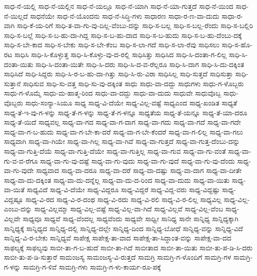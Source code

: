 {ಸಾಧ-ನೆ-ಯಲ್ಲಿ
ಸಾಧ-ನೆ-ಯಲ್ಲಿನ
ಸಾಧ-ನೆ-ಯಲ್ಲೂ
ಸಾಧ-ನೆ-ಯಾಗಿ
ಸಾಧ-ನೆ-ಯಾ-ಗುತ್ತದೆ
ಸಾಧ-ನೆ-ಯಿಂದ
ಸಾಧ-ನೆ-ಯಿಲ್ಲದೆ
ಸಾಧನೆಯೇ
ಸಾಧ-ನೆ-ಯೊಂದನು
ಸಾಧ-ನೆ-ಸಿದ್ಧಿ-ಗಳು
ಸಾಧಾರಣ
ಸಾಧಾ-ರ-ಣ-ವಾ-ದುದು
ಸಾಧಾ-ರ-ವಾಗಿ
ಸಾಧಿ-ಕೆ-ಯ-ರಿಗೆ
ಸಾಧಿ-ತ-ವಾ-ಗು-ವು-ದಿಲ್ಲ-ವೆಂಬು-ದನ್ನು
ಸಾಧಿ-ಸ-ಬಲ್ಲ
ಸಾಧಿ-ಸ-ಬಲ್ಲ-ರೆಂದು
ಸಾಧಿ-ಸ-ಬಲ್ಲಿರಿ
ಸಾಧಿ-ಸ-ಬಲ್ಲೆ
ಸಾಧಿ-ಸ-ಬ-ಹು-ದಾ-ಗಿದ್ದ
ಸಾಧಿ-ಸ-ಬ-ಹು-ದಾದ
ಸಾಧಿ-ಸ-ಬ-ಹುದು
ಸಾಧಿ-ಸ-ಬ-ಹು-ದೆಂಬು-ದಕ್ಕೆ
ಸಾಧಿ-ಸ-ಬೇ-ಕಾದ
ಸಾಧಿ-ಸ-ಬೇಕು
ಸಾಧಿ-ಸ-ಬೇ-ಕೆಂಬ
ಸಾಧಿ-ಸ-ಲಾ-ಗದೆ
ಸಾಧಿ-ಸ-ಲಾ-ರೆವು
ಸಾಧಿಸಲು
ಸಾಧಿ-ಸ-ಹೊ-ರಟ
ಸಾಧಿಸಿ
ಸಾಧಿ-ಸಿ-ಕೊಳ್ಳುತ್ತ
ಸಾಧಿ-ಸಿ-ಕೊಳ್ಳು-ವು-ದ-ರಲ್ಲಿ
ಸಾಧಿಸಿತ್ತು
ಸಾಧಿಸಿದ
ಸಾಧಿ-ಸಿ-ದಂತಾ-ಗ-ಲಿಲ್ಲ
ಸಾಧಿ-ಸಿ-ದಂತಾ-ಯಿತು
ಸಾಧಿ-ಸಿ-ದಂತಾ-ಯಿತೇ
ಸಾಧಿ-ಸಿ-ದರು
ಸಾಧಿ-ಸಿ-ದ-ವ-ರೆಲ್ಲರೂ
ಸಾಧಿ-ಸಿ-ದಾಗ
ಸಾಧಿ-ಸಿ-ದು-ದಕ್ಕಿಂತ
ಸಾಧಿಸಿದೆ
ಸಾಧಿ-ಸಿದ್ದರು
ಸಾಧಿ-ಸಿ-ರ-ಬ-ಹು-ದಾ-ಗಿತ್ತು
ಸಾಧಿ-ಸಿ-ರು-ವಿರಾ
ಸಾಧಿಸಿಲ್ಲ
ಸಾಧಿ-ಸುತ್ತದೆ
ಸಾಧಿಸುತ್ತಾ
ಸಾಧಿ-ಸುತ್ತಾನೆ
ಸಾಧಿಸುವ
ಸಾಧಿ-ಸು-ವತ್ತ
ಸಾಧಿ-ಸು-ವು-ದಕ್ಕಿಂತ
ಸಾಧು
ಸಾಧು-ವಾ-ದದ್ದು
ಸಾಧುಗಳು
ಸಾಧು-ಗ-ಳೊಬ್ಬರು
ಸಾಧು-ಗ-ಳೊಮ್ಮೆ
ಸಾಧು-ಮ-ಹಾತ್ಮ-ರಿಂದ
ಸಾಧು-ವಾ-ದದ್ದು
ಸಾಧು-ವಾ-ದುದು
ಸಾಧುವೇ
ಸಾಧುವೊಬ್ಬ
ಸಾಧು-ವೊಬ್ಬರು
ಸಾಧು-ಸಂನ್ಯಾ-ಸಿಯೂ
ಸಾಧ್ಯ
ಸಾಧ್ಯ-ವಿ-ದೆಯೇ
ಸಾಧ್ಯ-ವಿಲ್ಲ-ವಷ್ಟೆ
ಸಾಧ್ಯಎಂದ
ಸಾಧ್ಯ-ಖಂಡಿತ
ಸಾಧ್ಯತೆ
ಸಾಧ್ಯ-ತೆ-ಇ-ವು-ಗ-ಳನ್ನು
ಸಾಧ್ಯ-ತೆ-ಗ-ಳನ್ನು
ಸಾಧ್ಯ-ತೆ-ಗ-ಳನ್ನೂ
ಸಾಧ್ಯತೆಯ
ಸಾಧ್ಯ-ತೆ-ಯನ್ನೂ
ಸಾಧ್ಯ-ತೆ-ಯಾ-ದರೂ
ಸಾಧ್ಯ-ತೆ-ಯಿದೆ
ಸಾಧ್ಯವಲ್ಲ
ಸಾಧ್ಯ-ವಾ-ಗದ
ಸಾಧ್ಯ-ವಾ-ಗ-ದಾಗ
ಸಾಧ್ಯ-ವಾ-ಗದು
ಸಾಧ್ಯ-ವಾ-ಗದೆ
ಸಾಧ್ಯ-ವಾ-ಗದೇ
ಸಾಧ್ಯ-ವಾ-ಗ-ಬ-ಹುದು
ಸಾಧ್ಯ-ವಾ-ಗ-ಬೇ-ಕಾ-ದರೆ
ಸಾಧ್ಯ-ವಾ-ಗ-ಬೇ-ಕೆಂದರೆ
ಸಾಧ್ಯ-ವಾ-ಗ-ಲಿಲ್ಲ
ಸಾಧ್ಯ-ವಾ-ಗಲು
ಸಾಧ್ಯವಾಗಿ
ಸಾಧ್ಯ-ವಾ-ಗಿಯೇ
ಸಾಧ್ಯ-ವಾ-ಗಿಲ್ಲ
ಸಾಧ್ಯ-ವಾ-ಗಿವೆ
ಸಾಧ್ಯ-ವಾ-ಗುತ್ತದೆ
ಸಾಧ್ಯ-ವಾ-ಗುತ್ತ-ದೆಂಬು-ದನ್ನು
ಸಾಧ್ಯ-ವಾ-ಗುತ್ತಿ-ದೆಯೆ
ಸಾಧ್ಯ-ವಾ-ಗುತ್ತಿ-ದೆಯೇ
ಸಾಧ್ಯ-ವಾ-ಗುತ್ತಿಲ್ಲ
ಸಾಧ್ಯ-ವಾ-ಗುವ
ಸಾಧ್ಯ-ವಾ-ಗು-ವಂತೆ
ಸಾಧ್ಯ-ವಾ-ಗು-ವ-ವ-ರೆಗೂ
ಸಾಧ್ಯ-ವಾ-ಗು-ವು-ದಷ್ಟೆ
ಸಾಧ್ಯ-ವಾ-ಗು-ವುದು
ಸಾಧ್ಯ-ವಾ-ಗು-ವುದೆ
ಸಾಧ್ಯ-ವಾ-ಗು-ವು-ದೆಂದು
ಸಾಧ್ಯ-ವಾ-ಗು-ವುದೇ
ಸಾಧ್ಯವಾದ
ಸಾಧ್ಯ-ವಾ-ದರೂ
ಸಾಧ್ಯ-ವಾ-ದರೆ
ಸಾಧ್ಯ-ವಾ-ದಷ್ಟು
ಸಾಧ್ಯ-ವಾ-ದಾಗ
ಸಾಧ್ಯ-ವಾ-ದೀತೇ
ಸಾಧ್ಯ-ವಾ-ದು-ದಕ್ಕಿಂತ
ಸಾಧ್ಯ-ವಾ-ದು-ದನ್ನೆಲ್ಲ
ಸಾಧ್ಯ-ವಾ-ದು-ದ-ರಿಂದ
ಸಾಧ್ಯ-ವಾ-ದುದು
ಸಾಧ್ಯ-ವಾ-ಯಿತು
ಸಾಧ್ಯ-ವಾ-ಯಿತೆ
ಸಾಧ್ಯವಿದೆ
ಸಾಧ್ಯ-ವಿ-ದೆಯೇ
ಸಾಧ್ಯ-ವಿದ್ದರೂ
ಸಾಧ್ಯ-ವಿದ್ದರೆ
ಸಾಧ್ಯ-ವಿದ್ದ-ವರು
ಸಾಧ್ಯ-ವಿದ್ದಷ್ಟು
ಸಾಧ್ಯ-ವಿದ್ದಷ್ಟೂ
ಸಾಧ್ಯ-ವಿ-ರದ
ಸಾಧ್ಯ-ವಿ-ರ-ದಂಥ
ಸಾಧ್ಯ-ವಿ-ರದು
ಸಾಧ್ಯ-ವಿ-ರಲಿ
ಸಾಧ್ಯ-ವಿ-ರ-ಲಿಲ್ಲ
ಸಾಧ್ಯವಿಲ್ಲ
ಸಾಧ್ಯ-ವಿಲ್ಲ-ಎಂಬು-ದನ್ನು
ಸಾಧ್ಯ-ವಿಲ್ಲಮ್ಮಾ
ಸಾಧ್ಯ-ವಿಲ್ಲ-ವಷ್ಟೆ
ಸಾಧ್ಯ-ವಿಲ್ಲ-ವಾ-ಗಿದೆ
ಸಾಧ್ಯ-ವಿಲ್ಲವೆ
ಸಾಧ್ಯ-ವಿಲ್ಲ-ವೆಂಬ
ಸಾಧ್ಯ-ವಿಲ್ಲವೇ
ಸಾಧ್ಯವೂ
ಸಾಧ್ಯವೆ
ಸಾಧ್ಯ-ವೆಂದಲ್ಲ
ಸಾಧ್ಯವೆಂದು
ಸಾಧ್ಯವೇ
ಸಾಧ್ವೀ
ಸಾನಿಧ್ಯ
ಸಾನೇ
ಸಾನ್ನಿಧ್ಯ
ಸಾನ್ನಿಧ್ಯಕ್ಕಾಗಿ
ಸಾನ್ನಿಧ್ಯಕ್ಕೆ
ಸಾನ್ನಿಧ್ಯದ
ಸಾನ್ನಿಧ್ಯ-ದಲ್ಲಿ
ಸಾನ್ನಿಧ್ಯ-ದಲ್ಲೇ
ಸಾನ್ನಿಧ್ಯ-ದಿಂದ
ಸಾನ್ನಿಧ್ಯ-ಬೋಧೆ
ಸಾನ್ನಿಧ್ಯ-ವನ್ನು
ಸಾನ್ನಿಧ್ಯ-ವಿದೆ
ಸಾನ್ನಿಧ್ಯ-ವಿ-ರ-ಬೇಕು
ಸಾನ್ನಿಧ್ಯವೆ
ಸಾಪೇಕ್ಷ
ಸಾಪೇಕ್ಷ-ತಾ-ವಾದ
ಸಾಪೇಕ್ಷ-ತಾ-ಸಿದ್ಧಾಂತ-ವನ್ನು
ಸಾಪೇಕ್ಷ-ವಾ-ದದ
ಸಾಫಲ್ಯಕ್ಕೆ
ಸಾಫಲ್ಯವು
ಸಾಬೀ-ತಾ-ಗ-ಬ-ಹುದೆ
ಸಾಬೀ-ತಾ-ಗಿದೆ
ಸಾಬೀತಾದ
ಸಾಬೀ-ತಾ-ಯಿತು
ಸಾಬೀ-ತು-ಪ-ಡಿ-ಸಿ-ದರು
ಸಾಬೀ-ತು-ಪ-ಡಿ-ಸುತ್ತಾರೆ
ಸಾಮಂಜಸ್ಯ
ಸಾಮಂಜಸ್ಯ-ವಿ-ರುತ್ತದೆ
ಸಾಮಗ್ರಿ
ಸಾಮಗ್ರಿ-ಗ-ಳೊಂದಿಗೆ
ಸಾಮಗ್ರಿ-ಗಳ
ಸಾಮಗ್ರಿ-ಗ-ಳನ್ನು
ಸಾಮಗ್ರಿ-ಗ-ಳಿವೆ
ಸಾಮಗ್ರಿ-ಗಳು
ಸಾಮಗ್ರಿ-ಗ-ಳು-ಕಾರ್ಯ-ರೂ-ಪಕ್ಕೆ
}

